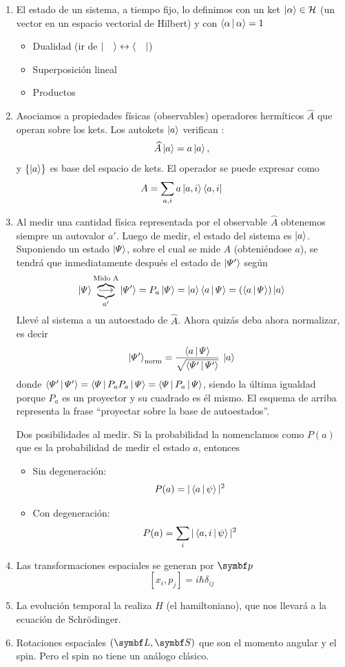 \documentclass[10pt,oneside]{CBFT_book}
\begin{document}
\begin{enumerate}
	\item El estado de un sistema, a tiempo fijo, lo definimos con un ket 
		$\Ket{\alpha} \in \mathcal{H}$ (un vector en un espacio vectorial de Hilbert) y
		con $\Braket{\alpha|\alpha}=1$
		\begin{itemize}
		 \item Dualidad (ir de $\Ket{\quad} \leftrightarrow \Bra{\quad}$)
		 \item Superposición lineal
		 \item Productos
		\end{itemize}
	\item Asociamos a propiedades físicas (observables) operadores hermíticos $\widehat{A}$ 
		que operan sobre los kets. Los autokets $\Ket{a}$ verifican :
	\[
		\widehat{A}\Ket{a} = a \Ket{a}, 
	\]
	y $\{ \Ket{a} \}$ es base del espacio de kets. El operador se puede expresar como
	\[
		A = \sum_{a,i} a \Ket{a,i}\Bra{a,i}
	\]
	\item Al medir una cantidad física representada por el observable $\widehat{A}$ obtenemos
	siempre un autovalor $a'$.
	Luego de medir, el estado del sistema es $\Ket{a}$.
	Suponiendo un estado $\Ket{\Psi}$, sobre el cual se mide $A$ (obteniéndose $a$), se tendrá que
	inmediatamente después el estado de $\Ket{\Psi'}$ según
	\[
		\Ket{\Psi} \overbrace{\underbrace{\longrightarrow}_{a'}}^{\text{Mido A}} \Ket{\Psi'} =
		P_a \Ket{\Psi} = \Ket{a}\Braket{a|\Psi} =(\Braket{a|\Psi})\Ket{a}
	\]
	Llevé al sistema a un autoestado de $\widehat{A}$. 
	Ahora quizás deba ahora normalizar, es decir
	\[
		\Ket{\Psi'}_\text{norm} = \frac{\Braket{a|\Psi}}{\sqrt{\Braket{\Psi'|\Psi'}}} \: \Ket{a}
	\]
	donde $\Braket{\Psi'|\Psi'}=\Braket{\Psi|P_a P_a|\Psi} = \Braket{\Psi|P_a|\Psi}$, siendo la
	última igualdad porque $P_a$ es un proyector y su cuadrado es él mismo.
	El esquema de arriba representa la frase ``proyectar sobre la base de autoestados''.
	
	Dos posibilidades al medir. Si la probabilidad la nomenclamos como $P(a)$ que es la probabilidad
	de medir el estado $a$, entonces
	\begin{itemize}
	 \item Sin degeneración:
	 \[
		P(a) = |\Braket{a|\psi}|^2
	 \]
	 \item Con degeneración:
	 \[
		P(a) = \sum_{i} |\Braket{a,i|\psi}|^2
	 \]
	\end{itemize}
	\item Las transformaciones espaciales se generan por $\vb{p}$
	\[	
		[x_i,p_j] = i\hbar\delta_{ij}
	\]
	\item La evolución temporal la realiza $H$ (el hamiltoniano), que nos llevará a la
	ecuación de Schrödinger.
	\item Rotaciones espaciales $(\vb L,\vb S)$ que son el momento angular y el spin.
	Pero el spin no tiene un análogo clásico.
\end{enumerate}
\end{document}
